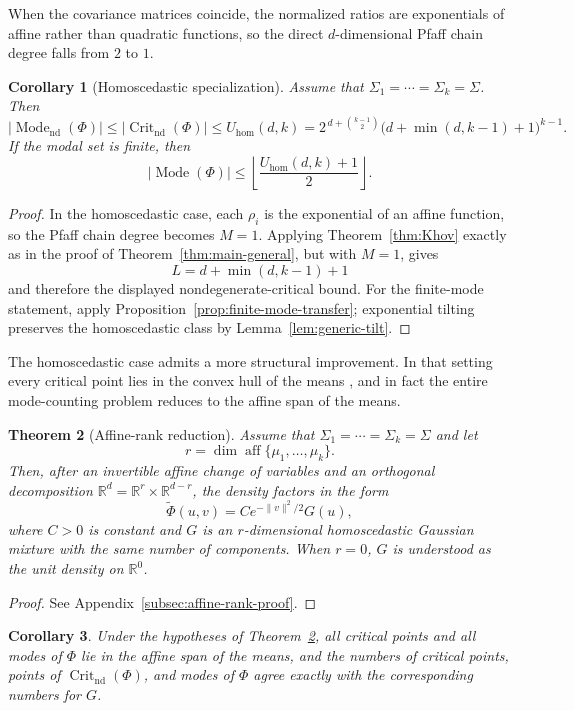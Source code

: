 \documentclass[11pt]{article}
\theoremstyle{plain}
\newtheorem{theorem}{Theorem}[section]
\newtheorem{corollary}[theorem]{Corollary}
\theoremstyle{definition}
\theoremstyle{remark}
\numberwithin{equation}{section}
\DeclareMathOperator{\aff}{aff}
\DeclareMathOperator{\Crit}{Crit}
\DeclareMathOperator{\Mode}{Mode}
\newcommand{\R}{\mathbb{R}}
\begin{document}
When the covariance matrices coincide, the normalized ratios are exponentials of affine rather than quadratic functions, so the direct $d$-dimensional Pfaff chain degree falls from $2$ to $1$.

\begin{corollary}[Homoscedastic specialization]\label{cor:hom-special}
Assume that $\Sigma_1=\cdots=\Sigma_k=\Sigma$. Then
\[
|\Mode_{\mathrm{nd}}(\Phi)|\le |\Crit_{\mathrm{nd}}(\Phi)|\le U_{\mathrm{hom}}(d,k)=2^{\,d+\binom{k-1}{2}}\bigl(d+\min(d,k-1)+1\bigr)^{k-1}.
\]
If the modal set is finite, then
\[
|\Mode(\Phi)|\le \left\lfloor\frac{U_{\mathrm{hom}}(d,k)+1}{2}\right\rfloor.
\]
\end{corollary}

\begin{proof}
In the homoscedastic case, each $\rho_i$ is the exponential of an affine function, so the Pfaff chain degree becomes $M=1$. Applying Theorem~\ref{thm:Khov} exactly as in the proof of Theorem~\ref{thm:main-general}, but with $M=1$, gives
\[
L=d+\min(d,k-1)+1
\]
and therefore the displayed nondegenerate-critical bound. For the finite-mode statement, apply Proposition~\ref{prop:finite-mode-transfer}; exponential tilting preserves the homoscedastic class by Lemma~\ref{lem:generic-tilt}.
\end{proof}

The homoscedastic case admits a more structural improvement. In that setting every critical point lies in the convex hull of the means \citep[Corollary~1]{RayLindsay2005}, and in fact the entire mode-counting problem reduces to the affine span of the means.

\begin{theorem}[Affine-rank reduction]\label{thm:affine-rank}
Assume that $\Sigma_1=\cdots=\Sigma_k=\Sigma$ and let
\[
r=\dim \aff\{\mu_1,\dots,\mu_k\}.
\]
Then, after an invertible affine change of variables and an orthogonal decomposition $\R^d=\R^r\times\R^{d-r}$, the density factors in the form
\[
\widetilde \Phi(u,v)=C e^{-\|v\|^2/2}G(u),
\]
where $C>0$ is constant and $G$ is an $r$-dimensional homoscedastic Gaussian mixture with the same number of components. When $r=0$, $G$ is understood as the unit density on $\R^0$.
\end{theorem}

\begin{proof}
See Appendix~\ref{subsec:affine-rank-proof}.
\end{proof}

\begin{corollary}\label{cor:affine-rank-consequence}
Under the hypotheses of Theorem~\ref{thm:affine-rank}, all critical points and all modes of $\Phi$ lie in the affine span of the means, and the numbers of critical points, points of $\Crit_{\mathrm{nd}}(\Phi)$, and modes of $\Phi$ agree exactly with the corresponding numbers for $G$.
\end{corollary}
\end{document}
